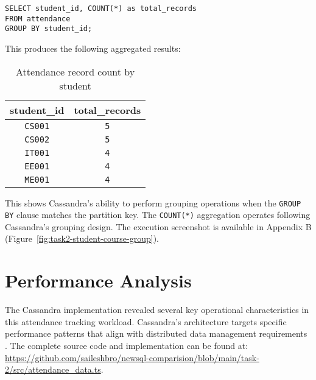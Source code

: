 \begin{verbatim}
SELECT student_id, COUNT(*) as total_records
FROM attendance
GROUP BY student_id;
\end{verbatim}

This produces the following aggregated results:

\begin{table}[H]
  \centering
  \begin{tabular}{|c|c|}
    \hline
    \textbf{student\_id} & \textbf{total\_records} \\
    \hline
    \texttt{CS001}                & \texttt{5}                       \\
    \texttt{CS002}                & \texttt{5}                       \\
    \texttt{IT001}                & \texttt{4}                       \\
    \texttt{EE001}                & \texttt{4}                       \\
    \texttt{ME001}                & \texttt{4}                       \\
    \hline
  \end{tabular}
  \caption{Attendance record count by student}
\end{table}

This shows Cassandra's ability to perform grouping operations when the \texttt{GROUP BY} clause matches the partition key. The \texttt{COUNT(*)} aggregation operates following Cassandra's grouping design. The execution screenshot is available in Appendix B (Figure~\ref{fig:task2-student-course-group}).

\section{Performance Analysis}

The Cassandra implementation revealed several key operational characteristics in this attendance tracking workload. Cassandra's architecture targets specific performance patterns that align with distributed data management requirements \parencite{cassandra_architecture}. The complete source code and implementation can be found at: \url{https://github.com/saileshbro/newsql-comparision/blob/main/task-2/src/attendance_data.ts}.

